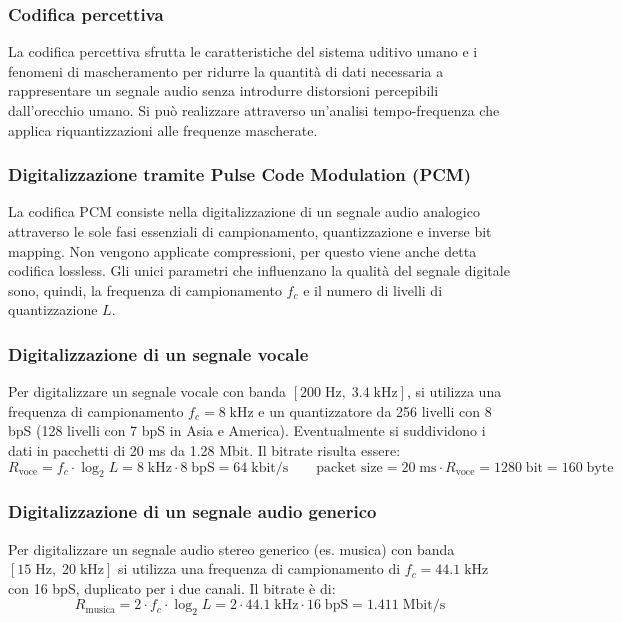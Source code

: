 \subsubsection*{Codifica percettiva}
La codifica percettiva sfrutta le caratteristiche del sistema uditivo umano e i fenomeni di mascheramento per ridurre
la quantità di dati necessaria a rappresentare un segnale audio senza introdurre distorsioni percepibili dall'orecchio
umano. Si può realizzare attraverso un'analisi tempo-frequenza che applica riquantizzazioni alle frequenze mascherate.

\subsubsection*{Digitalizzazione tramite Pulse Code Modulation (PCM)}
La codifica PCM consiste nella digitalizzazione di un segnale audio analogico attraverso le sole fasi essenziali di
campionamento, quantizzazione e inverse bit mapping. Non vengono applicate compressioni, per questo viene anche detta
codifica lossless. Gli unici parametri che influenzano la qualità del segnale digitale sono, quindi, la frequenza di
campionamento \(f_c\) e il numero di livelli di quantizzazione \(L\).

\subsubsection*{Digitalizzazione di un segnale vocale}
Per digitalizzare un segnale vocale con banda \([200 \; \text{Hz}, \; 3.4 \; \text{kHz}]\), si utilizza una frequenza
di campionamento \(f_c = 8 \; \text{kHz}\) e un quantizzatore da 256 livelli con 8 bpS (128 livelli con 7 bpS in Asia
e America). Eventualmente si suddividono i dati in pacchetti di 20 ms da 1.28 Mbit. Il bitrate risulta essere:
\[R_\text{voce} = f_c \cdot \log_2 L = 8 \; \text{kHz} \cdot 8 \; \text{bpS} = 64 \; \text{kbit/s} \qquad \text{packet size} = 20 \; \text{ms} \cdot R_\text{voce} = 1280 \; \text{bit} = 160 \; \text{byte}\]

\subsubsection*{Digitalizzazione di un segnale audio generico}
Per digitalizzare un segnale audio stereo generico (es. musica) con banda \([15 \; \text{Hz}, \; 20 \; \text{kHz}]\) si
utilizza una frequenza di campionamento di \(f_c = 44.1 \; \text{kHz}\) con 16 bpS, duplicato per i due canali. Il bitrate è di:
\[R_\text{musica} = 2 \cdot f_c \cdot \log_2 L = 2 \cdot 44.1 \; \text{kHz} \cdot 16 \; \text{bpS} = 1.411 \; \text{Mbit/s}\]

